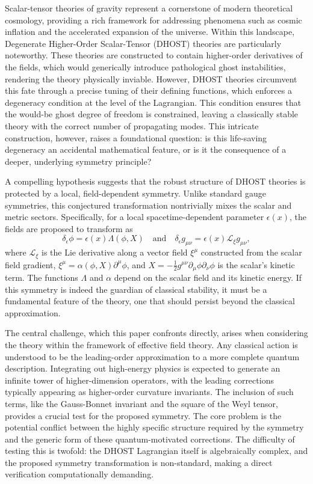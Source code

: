 \documentclass[twocolumn]{aastex631}
\begin{document}
Scalar-tensor theories of gravity represent a cornerstone of modern theoretical cosmology, providing a rich framework for addressing phenomena such as cosmic inflation and the accelerated expansion of the universe. Within this landscape, Degenerate Higher-Order Scalar-Tensor (DHOST) theories are particularly noteworthy. These theories are constructed to contain higher-order derivatives of the fields, which would generically introduce pathological ghost instabilities, rendering the theory physically inviable. However, DHOST theories circumvent this fate through a precise tuning of their defining functions, which enforces a degeneracy condition at the level of the Lagrangian. This condition ensures that the would-be ghost degree of freedom is constrained, leaving a classically stable theory with the correct number of propagating modes. This intricate construction, however, raises a foundational question: is this life-saving degeneracy an accidental mathematical feature, or is it the consequence of a deeper, underlying symmetry principle?

A compelling hypothesis suggests that the robust structure of DHOST theories is protected by a local, field-dependent symmetry. Unlike standard gauge symmetries, this conjectured transformation nontrivially mixes the scalar and metric sectors. Specifically, for a local spacetime-dependent parameter $\epsilon(x)$, the fields are proposed to transform as
\begin{equation}
\delta_\epsilon \phi = \epsilon(x) \Lambda(\phi, X) \quad \text{and} \quad \delta_\epsilon g_{\mu\nu} = \epsilon(x) \mathcal{L}_{\xi} g_{\mu\nu},
\end{equation}
where $\mathcal{L}_{\xi}$ is the Lie derivative along a vector field $\xi^\mu$ constructed from the scalar field gradient, $\xi^\mu = \alpha(\phi, X)\partial^\mu\phi$, and $X = -\frac{1}{2}g^{\mu\nu}\partial_\mu\phi\partial_\nu\phi$ is the scalar's kinetic term. The functions $\Lambda$ and $\alpha$ depend on the scalar field and its kinetic energy. If this symmetry is indeed the guardian of classical stability, it must be a fundamental feature of the theory, one that should persist beyond the classical approximation.

The central challenge, which this paper confronts directly, arises when considering the theory within the framework of effective field theory. Any classical action is understood to be the leading-order approximation to a more complete quantum description. Integrating out high-energy physics is expected to generate an infinite tower of higher-dimension operators, with the leading corrections typically appearing as higher-order curvature invariants. The inclusion of such terms, like the Gauss-Bonnet invariant and the square of the Weyl tensor, provides a crucial test for the proposed symmetry. The core problem is the potential conflict between the highly specific structure required by the symmetry and the generic form of these quantum-motivated corrections. The difficulty of testing this is twofold: the DHOST Lagrangian itself is algebraically complex, and the proposed symmetry transformation is non-standard, making a direct verification computationally demanding.
\end{document}
